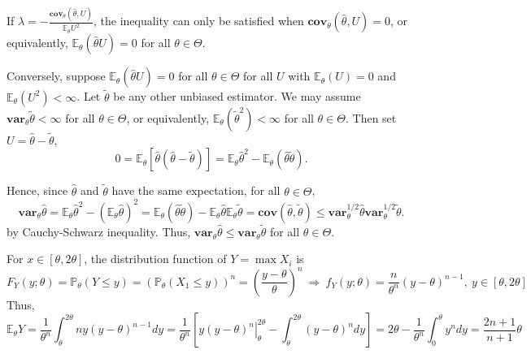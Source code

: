 If $\lambda = -\frac{\mathbf{cov}_\theta\left(\hat{\theta},U \right)}{\mathbb{E}_\theta U^2}$, the inequality can only be satisfied when $\mathbf{cov}_\theta\left(\hat{\theta},U \right)=0$, or equivalently, $\mathbb{E}_\theta(\hat{\theta}U)=0$ for all $\theta\in \Theta$.

Conversely, suppose $\mathbb{E}_\theta(\hat{\theta}U)=0$ for all $\theta\in \Theta$ for all $U$ with $\mathbb{E}_\theta(U)=0$ and $\mathbb{E}_\theta(U^2)<\infty$. Let $\tilde{\theta}$ be any other unbiased estimator. We may assume $\mathbf{var}_\theta\tilde{\theta}<\infty$ for all $\theta\in \Theta$, or equivalently, $\mathbb{E}_\theta(\tilde{\theta}^2)<\infty$ for all $\theta\in \Theta$. Then set $U=\hat{\theta}-\tilde{\theta}$,
\begin{equation}
0=\mathbb{E}_\theta \left[\hat{\theta} \left(\hat{\theta}-\tilde{\theta}\right)\right] = \mathbb{E}_\theta \hat{\theta}^2 - \mathbb{E}_\theta \left(\hat{\theta}\tilde{\theta}\right).
\end{equation}

Hence, since $\hat{\theta}$ and $\tilde{\theta}$ have the same expectation, for all $\theta\in \Theta$,
\begin{equation}
\mathbf{var}_\theta \hat{\theta} = \mathbb{E}_\theta \hat{\theta}^2 - \left(\mathbb{E}_\theta \hat{\theta}\right)^2 =  \mathbb{E}_\theta \left(\hat{\theta}\tilde{\theta}\right) - \mathbb{E}_\theta \hat{\theta}\mathbb{E}_\theta \tilde{\theta} = \mathbf{cov}\left(\hat{\theta},\tilde{\theta}\right) \leq \mathbf{var}_\theta^{1/2} \hat{\theta}\mathbf{var}_\theta^{1/2} \tilde{\theta}.
\end{equation}
by Cauchy-Schwarz inequality. Thus, $\mathbf{var}_\theta\hat{\theta}\leq \mathbf{var}_\theta\tilde{\theta}$ for all $\theta\in\Theta$.

For $x\in[\theta,2\theta]$, the distribution function of $Y=\max X_i$ is
\begin{equation}
F_Y(y;\theta) = \mathbb{P}_\theta (Y\leq y) = \left(\mathbb{P}_\theta (X_1\leq y)\right)^n =  \left(\frac{y-\theta}{\theta}\right)^n \ \Rightarrow \ f_Y(y;\theta) =  \frac{n}{\theta^n}\left(y-\theta\right)^{n-1},\ y\in[\theta,2\theta]
\end{equation}
Thus,
\begin{equation}
\mathbb{E}_\theta Y = \frac{1}{\theta^n}\int^{2\theta}_\theta ny \left(y-\theta\right)^{n-1}dy = \frac{1}{\theta^n}\left[y\left.\left(y-\theta\right)^n\right|^{2\theta}_\theta - \int^{2\theta}_\theta  \left(y-\theta\right)^ndy \right]= 2\theta -  \frac{1}{\theta^n}\int^{\theta}_0  y^ndy = \frac{2n+1}{n+1}\theta
\end{equation}

